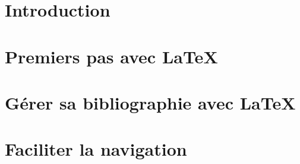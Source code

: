 \part{Introduction}




\part{Premiers pas avec \LaTeX}








\part{Gérer sa bibliographie avec \LaTeX}






\part{Faciliter la navigation}

